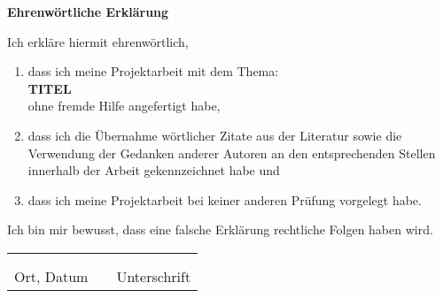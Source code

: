 \documentclass[a4paper, 11pt]{article}
\begin{document}
\begin{center}
  \textbf{Ehrenwörtliche Erklärung}
\end{center}
\vspace*{1.5cm}
Ich erkläre hiermit ehrenwörtlich,
\begin{flushleft}
  \begin{enumerate}[leftmargin=0.5cm]
    \item 	dass ich meine {Projektarbeit}
    mit dem Thema:  \\
    \vspace*{1cm}
            \textbf{TITEL} \\
    \vspace*{1cm}
            ohne fremde Hilfe angefertigt habe, \\
    \item	dass ich die Übernahme wörtlicher Zitate aus der Literatur sowie die Verwendung der
            Gedanken anderer Autoren an den entsprechenden Stellen innerhalb der Arbeit gekennzeichnet habe und  \\
    \item	dass ich meine {Projektarbeit}
    bei keiner anderen Prüfung vorgelegt habe. \\
    \vspace*{1cm}
  \end{enumerate}
  \noindent
Ich bin mir bewusst, dass eine falsche Erklärung rechtliche Folgen haben wird.
\end{flushleft}
\vspace*{1cm}
\begin{tabular} {lrl}
  \hspace{5.5cm} & \hspace{3cm} & \hspace{5.5cm} \\
  \hrulefill & & \hrulefill \\
  Ort, Datum & & Unterschrift
\end{tabular}
\vspace*{\fill}
\end{document}
